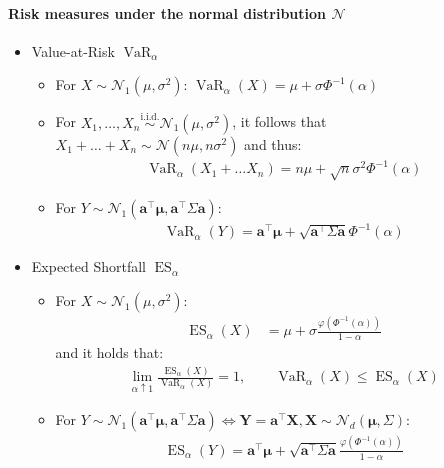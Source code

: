 \documentclass[a4paper,landscape,8pt,fleqn]{scrartcl}
\DeclareMathOperator{\VaR}{VaR}				%
\DeclareMathOperator{\ES}{ES}					%
\begin{document}
\begin{multicols*}{3}
\paragraph{Risk measures under the normal distribution $\mathcal{N}$}
\begin{itemize}
\item Value-at-Risk $\VaR_\alpha$
\begin{itemize}
\item For $X \sim \mathcal{N}_1(\mu, \sigma^2)$: $\VaR_\alpha(X) = \mu + \sigma \Phi^{-1}(\alpha)$
\item For $X_1, \ldots, X_n \overset{\text{i.i.d.}}{\sim} \mathcal{N}_1(\mu, \sigma^2)$, it follows that \\
$X_1 + \ldots + X_n \sim \mathcal{N}(n \mu, n \sigma^2)$ and thus:
\begin{align*}
\VaR_\alpha(X_1 + \ldots X_n) = n \mu + \sqrt{n} \sigma^2 \Phi^{-1}(\alpha)
\end{align*}
\item For $Y \sim \mathcal{N}_1(\bm a^\top \bm \mu, \bm a^\top \Sigma \bm a)$:
\begin{align*}
\VaR_\alpha(Y) = \bm a^\top \bm \mu + \sqrt{\bm a^\top \Sigma \bm a} \Phi^{-1}(\alpha)
\end{align*}
\end{itemize}
\item Expected Shortfall $\ES_\alpha$
\begin{itemize}
\item For $X \sim \mathcal{N}_1(\mu, \sigma^2)$:
\begin{align*}
\ES_\alpha(X) &= \mu + \sigma \frac{\varphi \left( \Phi^{-1}(\alpha) \right)}{1-\alpha}
\end{align*}
and it holds that:
\begin{align*}
\lim_{\alpha \uparrow 1} \frac{\ES_\alpha(X)}{\VaR_\alpha(X)} = 1, \qquad \VaR_\alpha(X) \leq \ES_\alpha(X)
\end{align*}
\item For $Y \sim \mathcal{N}_1(\bm a^\top \bm \mu, \bm a^\top \Sigma \bm a) \Leftrightarrow \bm Y = \bm a^\top \bm X, \bm X \sim \mathcal{N}_d(\bm \mu, \Sigma)$:
\begin{align*}
\ES_\alpha(Y) = \bm a^\top \bm \mu + \sqrt{\bm a^\top \Sigma \bm a} \frac{\varphi \left( \Phi^{-1}(\alpha) \right)}{1-\alpha}
\end{align*}
\end{itemize}
\end{itemize}


\end{multicols*}
\end{document}
